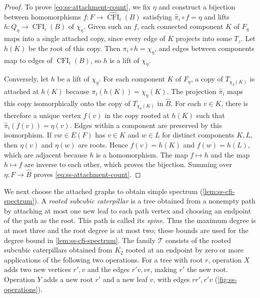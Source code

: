 \documentclass[11pt,a4paper]{article}
\theoremstyle{plain}
\theoremstyle{definition}
\DeclareMathOperator{\CFI}{CFI}
\begin{document}
\begin{proof}
To prove \cref{eq:ss-attachment-count}, we fix $\eta$ and construct a
bijection between homomorphisms
$f:F\to\widehat{\CFI}_i(B)$ satisfying $\widehat\pi_i\circ f=\eta$
and lifts $h:Q_\eta\to\CFI_i(B)$ of $\chi_\eta$.
Given such an $f$, each connected component $K$ of $F_\eta$ maps
into a single attached copy, since every edge of $K$ projects into some
$T_z$. Let $h(K)$ be the root of this copy.
Then $\pi_i\circ h=\chi_\eta$, and edges between components map to edges
of $\CFI_i(B)$, so $h$ is a lift of $\chi_\eta$.

Conversely, let $h$ be a lift of $\chi_\eta$.
For each component $K$ of $F_\eta$, a copy of $T_{\chi_\eta(K)}$
is attached at $h(K)$ because $\pi_i(h(K))=\chi_\eta(K)$.
The projection $\widehat\pi_i$ maps this copy isomorphically onto
the copy of $T_{\chi_\eta(K)}$ in $\widehat B$.
For each $v\in K$, there is therefore a unique vertex $f(v)$ in the
copy rooted at $h(K)$ such that $\widehat\pi_i(f(v))=\eta(v)$.
Edges within a component are preserved by this isomorphism.
If $vw\in E(F)$ has $v\in K$ and $w\in L$ for distinct components $K,L$, then $\eta(v)$ and
$\eta(w)$ are roots. Hence $f(v)=h(K)$ and $f(w)=h(L)$, which are
adjacent because $h$ is a homomorphism.
The map $f\mapsto h$ and the map $h\mapsto f$ are inverse to each
other, which proves the bijection.
Summing over $\eta:F\to\widehat B$ proves \cref{eq:ss-attachment-count}.
\end{proof}

We next choose the attached graphs to obtain simple spectrum
(\cref{lem:ss-cfi-spectrum}).
A \emph{rooted subcubic caterpillar} is a tree obtained from a nonempty path
by attaching at most one new leaf to each path vertex and choosing an
endpoint of the path as the root. This path is called its \emph{spine}.
Thus the maximum degree is at most three and
the root degree is at most two; these bounds are used for the degree
bound in \cref{lem:ss-cfi-spectrum}.
The family $\mathcal T$ consists of the rooted subcubic caterpillars
obtained from $K_2$ rooted at an endpoint by zero or more applications
of the following two operations.
For a tree with root $r$, operation $X$ adds two new vertices $r',v$
and the edges $r'v,vr$, making $r'$ the new root.
Operation $Y$ adds a new root $r'$ and a new leaf $v$, with edges
$rr',r'v$ (\cref{fig:ss-operations}).
\end{document}
